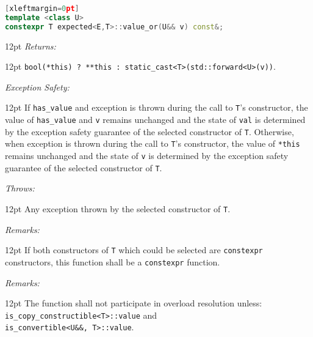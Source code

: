 \documentclass[a4paper,10pt]{article}
\newcommand{\cpp}[1]{\lstinline{#1}}
\newcommand{\wordingItem}[1]{\noindent\textit{#1:}}
\newenvironment{wordingTextItem}[1]{\wordingItem{#1}\vspace{2pt}\noindent\begin{adjustwidth}{12pt}{}}{\vspace{2pt}\end{adjustwidth}}
\newenvironment{wordingPara}{\begin{adjustwidth}{12pt}{}}{\end{adjustwidth}}
\begin{document}
\begin{lstlisting}[language=C++][xleftmargin=0pt]
template <class U>
constexpr T expected<E,T>::value_or(U&& v) const&; 
\end{lstlisting}
\begin{wordingPara}
\begin{wordingTextItem}{Returns}
\cpp{bool(*this) ? **this : static_cast<T>(std::forward<U>(v))}.
\end{wordingTextItem}
\begin{wordingTextItem}{Exception Safety}
If \cpp{has_value} and exception is thrown during the call to \cpp{T}'s constructor, the value of \cpp{has_value} and \cpp{v} remains unchanged and the state of \cpp{val} is determined by the exception safety guarantee of the selected constructor of \cpp{T}. Otherwise, when exception is thrown during the call to \cpp{T}'s constructor, the value of \cpp{*this} remains unchanged and the state of \cpp{v} is determined by the exception safety guarantee of the selected constructor of \cpp{T}.
\end{wordingTextItem}
\begin{wordingTextItem}{Throws}
Any exception thrown by the selected constructor of \cpp{T}.
\end{wordingTextItem}
\begin{wordingTextItem}{Remarks}
If both constructors of \cpp{T} which could be selected are \cpp{constexpr} constructors, this function shall be a \cpp{constexpr} function.
\end{wordingTextItem}
\begin{wordingTextItem}{Remarks}
The function shall not participate in overload resolution unless: \\
\cpp{is_copy_constructible<T>::value} and \\
\cpp{is_convertible<U&&, T>::value}.
\end{wordingTextItem}
\end{wordingPara}
\end{document}
